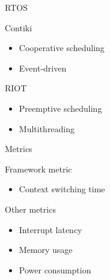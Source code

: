 \documentclass{beamer}
\begin{document}

\begin{frame}{RTOS}
\protect\hypertarget{rtos}{}

\begin{block}{Contiki}

\begin{itemize}
\tightlist
\item
  Cooperative scheduling
\item
  Event-driven
\end{itemize}

\end{block}

\begin{block}{RIOT}

\begin{itemize}
\tightlist
\item
  Preemptive scheduling
\item
  Multithreading
\end{itemize}

\end{block}

\end{frame}


\begin{frame}{Metrics}
\protect\hypertarget{metrics}{}

\begin{block}{Framework metric}

\begin{itemize}
\tightlist
\item
  Context switching time
\end{itemize}

\end{block}

\begin{block}{Other metrics}

\begin{itemize}
\tightlist
\item
  Interrupt latency
\item
  Memory usage
\item
  Power consumption
\end{itemize}

\end{block}

\end{frame}


\end{document}
